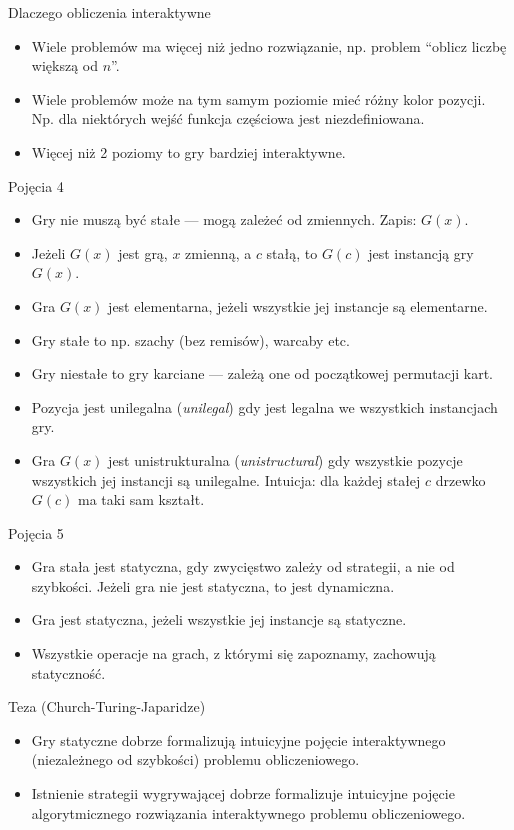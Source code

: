 \documentclass{beamer}
\begin{document}
\begin{frame}{Dlaczego obliczenia interaktywne}
\begin{itemize}
	\item Wiele problemów ma więcej niż jedno rozwiązanie, np. problem ``oblicz liczbę większą od $n$''.
	\item Wiele problemów może na tym samym poziomie mieć różny kolor pozycji. Np. dla niektórych wejść funkcja częściowa jest niezdefiniowana.
	\item Więcej niż 2 poziomy to gry bardziej interaktywne.
\end{itemize}
\end{frame}

\begin{frame}{Pojęcia 4}
\begin{itemize}
	\item Gry nie muszą być stałe — mogą zależeć od zmiennych. Zapis: $G(x)$.
	\item Jeżeli $G(x)$ jest grą, $x$ zmienną, a $c$ stałą, to $G(c)$ jest instancją gry $G(x)$.
	\item Gra $G(x)$ jest elementarna, jeżeli wszystkie jej instancje są elementarne.
	\item Gry stałe to np. szachy (bez remisów), warcaby etc.
	\item Gry niestałe to gry karciane — zależą one od początkowej permutacji kart.
	\item Pozycja jest unilegalna (\textit{unilegal}) gdy jest legalna we wszystkich instancjach gry.
	\item Gra $G(x)$ jest unistrukturalna (\textit{unistructural}) gdy wszystkie pozycje wszystkich jej instancji są unilegalne. Intuicja: dla każdej stałej $c$ drzewko $G(c)$ ma taki sam kształt.
\end{itemize}
\end{frame}

\begin{frame}{Pojęcia 5}
\begin{itemize}
	\item Gra stała jest statyczna, gdy zwycięstwo zależy od strategii, a nie od szybkości. Jeżeli gra nie jest statyczna, to jest dynamiczna.
	\item Gra jest statyczna, jeżeli wszystkie jej instancje są statyczne.
	\item Wszystkie operacje na grach, z którymi się zapoznamy, zachowują statyczność.
\end{itemize}
\end{frame}

\begin{frame}{Teza (Church-Turing-Japaridze)}
\begin{itemize}
	\item Gry statyczne dobrze formalizują intuicyjne pojęcie interaktywnego (niezależnego od szybkości) problemu obliczeniowego.
	\item Istnienie strategii wygrywającej dobrze formalizuje intuicyjne pojęcie algorytmicznego rozwiązania interaktywnego problemu obliczeniowego.
\end{itemize}
\end{frame}
\end{document}
